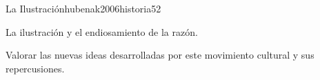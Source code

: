 \begin{syllabus}
\begin{unit}{La Ilustración}{hubenak2006historia}{5}{2}
\begin{topics}
	\item La ilustración y el endiosamiento de la razón.
\end{topics}
\begin{unitgoals}
	\item Valorar las nuevas ideas desarrolladas por este movimiento cultural y sus repercusiones.
\end{unitgoals}
\end{unit}



\begin{coursebibliography}
\end{coursebibliography}

\end{syllabus}
